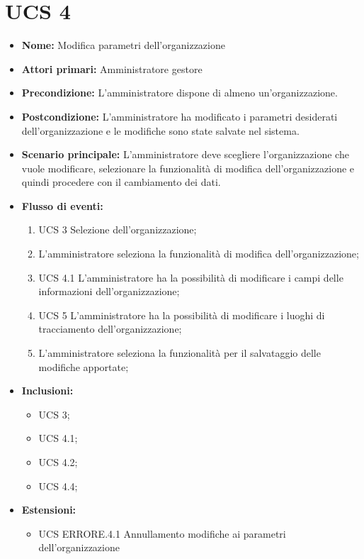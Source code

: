 

\section{UCS 4}%
\begin{itemize}
    \item \textbf{Nome:} Modifica parametri dell'organizzazione
    \item \textbf{Attori primari:} Amministratore gestore
    \item \textbf{Precondizione:} L’amministratore dispone di almeno un'organizzazione.
    \item \textbf{Postcondizione:} L’amministratore ha modificato i parametri desiderati dell'organizzazione e le modifiche sono state salvate nel sistema.
    \item \textbf{Scenario principale:} L'amministratore deve scegliere l'organizzazione che vuole modificare, selezionare la funzionalità di modifica dell'organizzazione e quindi procedere con il cambiamento dei dati.
    \item \textbf{Flusso di eventi:}
    \begin{enumerate}
        \item UCS 3 Selezione dell'organizzazione;
        \item L'amministratore seleziona la funzionalità di modifica dell'organizzazione;
        \item UCS 4.1 L'amministratore ha la possibilità di modificare i campi delle informazioni dell’organizzazione;
        \item UCS 5 L'amministratore ha la possibilità di modificare i luoghi di tracciamento dell’organizzazione;
        \item L'amministratore seleziona la funzionalità per il salvataggio delle modifiche apportate;
    \end{enumerate}
    \item \textbf{Inclusioni:}
    \begin{itemize}
        \item UCS 3;
        \item UCS 4.1;
        \item UCS 4.2;
        \item UCS 4.4;
    \end{itemize}
    \item \textbf{Estensioni:}
    \begin{itemize}
        \item UCS ERRORE.4.1 Annullamento modifiche ai parametri dell'organizzazione
    \end{itemize}
\end{itemize}

